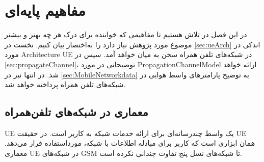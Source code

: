 \chapter{مفاهیم پایه‌ای}
\label{chap:concepts}

در این فصل در تلاش هستیم تا مفاهیمی که خواننده برای درک هر چه بهتر و بیشتر موضوع مورد پژوهش نیاز دارد را به‌اختصار بیان کنیم. نخست در 
\autoref{sec:ueArch} 
اندکی در مورد 
\gls{Architecture} \gls{UE} در
شبکه‌های تلفن همراه سخن به میان خواهد آمد. سپس در 
\autoref{sec:propagateChannel}،
توضیحاتی در مورد
\gls{PropagationChannelModel}
ارائه خواهد شد. در انتها نیز در
\autoref{sec:MobileNetworkdata} 
به توضیح پارامترهای واسط هوایی در شبکه‌های تلفن همراه پرداخته خواهد شد.


\section{معماری  در شبکه‌های تلفن‌همراه} 
\label{sec:MobileNetworkdata}
\label{sec:ueArch}
‎\gls{UE} 
یک واسط چندرسانه‌ای برای ارائه خدمات شبکه به کاربر است. در حقیقت ‎\gls{UE}‎ همان ابزاری است که کاربر برای مبادله اطلاعات با شبکه، مورداستفاده قرار می‌دهد. معماری ‎\gls{UE}‎ در شبکه‌های ‎\gls{GSM}‎ تا شبکه‌های نسل پنج تفاوت چندانی نکرده است. 